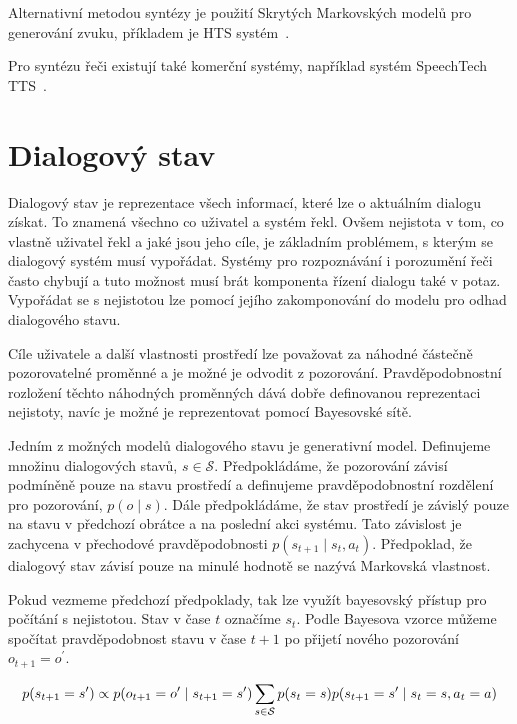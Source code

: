 Alternativní metodou syntézy je použití Skrytých Markovských modelů pro generování zvuku, příkladem je HTS systém~\cite{zen2007hmm}.

Pro syntézu řeči existují také komerční systémy, například systém SpeechTech TTS~\cite{speechtech}.

\section{Dialogový stav}

Dialogový stav je reprezentace všech informací, které lze o aktuálním dialogu získat.
To znamená všechno co uživatel a systém řekl.
Ovšem nejistota v tom, co vlastně uživatel řekl a jaké jsou jeho cíle, je základním problémem, s kterým se dialogový systém musí vypořádat.
Systémy pro rozpoznávání i porozumění řeči často chybují a tuto možnost musí brát komponenta řízení dialogu také v potaz.
Vypořádat se s nejistotou lze pomocí jejího zakomponování do modelu pro odhad dialogového stavu.

Cíle uživatele a další vlastnosti prostředí lze považovat za náhodné částečně pozorovatelné proměnné a je možné je odvodit z pozorování.
Pravděpodobnostní rozložení těchto náhodných proměnných dává dobře definovanou reprezentaci nejistoty, navíc je možné je reprezentovat pomocí Bayesovské sítě.

Jedním z možných modelů dialogového stavu je generativní model.
Definujeme množinu dialogových stavů, $s \in \mathcal{S}$.
Předpokládáme, že pozorování závisí podmíněně pouze na stavu prostředí a definujeme pravděpodobnostní rozdělení pro pozorování, $p(o \mid s)$.
Dále předpokládáme, že stav prostředí je závislý pouze na stavu v předchozí obrátce a na poslední akci systému.
Tato závislost je zachycena v přechodové pravděpodobnosti $p(s_{t+1} \mid s_t, a_t)$.
Předpoklad, že dialogový stav závisí pouze na minulé hodnotě se nazývá Markovská vlastnost.

Pokud vezmeme předchozí předpoklady, tak lze využít bayesovský přístup pro počítání s nejistotou.
Stav v čase $t$ označíme $s_t$.
Podle Bayesova vzorce můžeme spočítat pravděpodobnost stavu v čase $t+1$ po přijetí nového pozorování $o_{t+1} = o^\prime$.

\begin{equation}
\small
p(s_{t+1} = s^\prime) \propto
    p(o_{t+1} = o^\prime \mid s_{t+1} = s^\prime)
    \sum_{s \in \mathcal{S}}
        p(s_t = s)
        p(s_{t+1} = s^\prime \mid s_t = s, a_t = a)
\label{eq:beliefupdate}
\end{equation}

